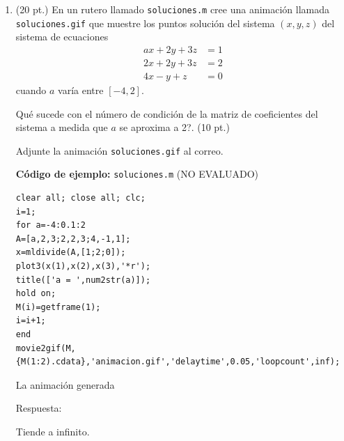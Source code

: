 \documentclass[11pt]{article}
\begin{document}
\begin{enumerate}
\newpage
\item (20 pt.) En un rutero llamado \texttt{soluciones.m} cree una animaci\'on llamada \texttt{soluciones.gif} que muestre los puntos soluci\'on del sistema $(x,y,z)$ del sistema de ecuaciones
$$
\begin{array}{lr}
ax+2y+3z	&	=1\\
2x+2y+3z	&	=2\\
4x-y+z		&	=0
\end{array}
$$
cuando $a$ var\'ia entre $[-4,2]$. 

\textquestiondown Qu\'e sucede con el n\'umero de condici\'on de la matriz de coeficientes del sistema a medida que $a$ se aproxima a 2?. (10 pt.)

\fbox{ \begin{minipage}{\textwidth}   \hfill\vspace{1cm}   \end{minipage} } 

Adjunte la animaci\'on \texttt{soluciones.gif} al correo.

\textbf{C\'odigo de ejemplo:} \texttt{soluciones.m} (NO EVALUADO)
\begin{lstlisting}
clear all; close all; clc;
i=1;
for a=-4:0.1:2
A=[a,2,3;2,2,3;4,-1,1];
x=mldivide(A,[1;2;0]);
plot3(x(1),x(2),x(3),'*r');
title(['a = ',num2str(a)]);
hold on;
M(i)=getframe(1);
i=i+1;
end
movie2gif(M,{M(1:2).cdata},'animacion.gif','delaytime',0.05,'loopcount',inf);
\end{lstlisting}

La animaci\'on generada 

Respuesta:

Tiende a infinito. 


\end{enumerate}
\end{document}
